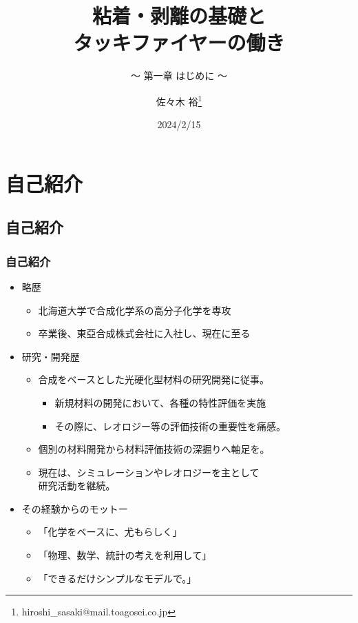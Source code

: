 \documentclass[unicode,12pt]{beamer}%
\title{粘着・剥離の基礎と\\タッキファイヤーの働き}
\subtitle{ ～ 第一章 はじめに ～}
\author[東亞合成 佐々木]{佐々木 裕\thanks{hiroshi\_sasaki@mail.toagosei.co.jp}}
\institute[東亞合成]{東亞合成株式会社}
\date{2024/2/15}
\begin{document}
\maketitle

\begin{frame} 
    \tableofcontents[]
\end{frame} 


\section{自己紹介}
\subsection{自己紹介}
\begin{frame}
	\frametitle{自己紹介}
	\begin{itemize}
		\item 略歴
			\begin{itemize}
				\item 北海道大学で合成化学系の高分子化学を専攻
				\item 卒業後、東亞合成株式会社に入社し、現在に至る
			\end{itemize}
		\item  研究・開発歴
			\begin{itemize}
				\item 合成をベースとした光硬化型材料の研究開発に従事。
				\begin{itemize}
					\item 新規材料の開発において、各種の特性評価を実施
					\item その際に、レオロジー等の評価技術の重要性を痛感。
				\end{itemize}
				\item 個別の材料開発から材料評価技術の深掘りへ軸足を。
				\item 現在は、シミュレーションやレオロジーを主として\\研究活動を継続。
			\end{itemize}
		\item その経験からのモットー
			\begin{itemize}
				\item 「化学をベースに、尤もらしく」
				\item 「物理、数学、統計の考えを利用して」
				\item 「できるだけシンプルなモデルで。」
			\end{itemize}
	\end{itemize}
	
\end{frame}
\end{document}
